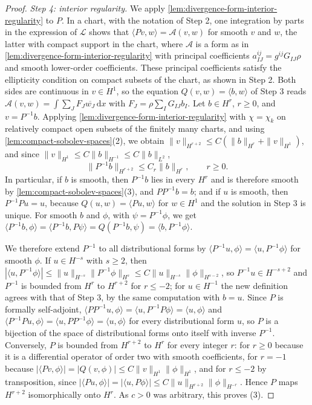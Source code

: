 \begin{proof}
\emph{Step 4: interior regularity.} We apply \cref{lem:divergence-form-interior-regularity} to $P$. In a chart, with the notation of Step 2, one integration by parts in the expression of $\mathcal L$ shows that $\langle Pv,w\rangle=\mathcal A(v,w)$ for smooth $v$ and $w$, the latter with compact support in the chart, where $\mathcal A$ is a form as in \cref{lem:divergence-form-interior-regularity} with principal coefficients $a^{ij}_{IJ}=g^{ij}G_{IJ}\rho$ and smooth lower-order coefficients. These principal coefficients satisfy the ellipticity condition on compact subsets of the chart, as shown in Step 2. Both sides are continuous in $v\in H^1$, so the equation $Q(v,w)=\langle b,w\rangle$ of Step 3 reads $\mathcal A(v,w)=\int\sum_JF_J\overline{w_J}\,\mathrm dx$ with $F_J=\rho\sum_IG_{IJ}b_I$. Let $b\in H^r$, $r\geq0$, and $v=P^{-1}b$. Applying \cref{lem:divergence-form-interior-regularity} with $\chi=\chi_k$ on relatively compact open subsets of the finitely many charts, and using \cref{lem:compact-sobolev-spaces}(2), we obtain $\|v\|_{H^{r+2}}\leq C(\|b\|_{H^r}+\|v\|_{H^1})$, and since $\|v\|_{H^1}\leq C\|b\|_{H^{-1}}\leq C\|b\|_{L^2}$,
\[
 \|P^{-1}b\|_{H^{r+2}}\leq C_r\|b\|_{H^r},\qquad r\geq0.
\]
In particular, if $b$ is smooth, then $P^{-1}b$ lies in every $H^r$ and is therefore smooth by \cref{lem:compact-sobolev-spaces}(3), and $PP^{-1}b=b$; and if $u$ is smooth, then $P^{-1}Pu=u$, because $Q(u,w)=\langle Pu,w\rangle$ for $w\in H^1$ and the solution in Step 3 is unique. For smooth $b$ and $\phi$, with $\psi=P^{-1}\phi$, we get $\langle P^{-1}b,\phi\rangle=\langle P^{-1}b,P\psi\rangle=Q(P^{-1}b,\psi)=\langle b,P^{-1}\phi\rangle$.

We therefore extend $P^{-1}$ to all distributional forms by $\langle P^{-1}u,\phi\rangle=\langle u,P^{-1}\phi\rangle$ for smooth $\phi$. If $u\in H^{-s}$ with $s\geq2$, then $|\langle u,P^{-1}\phi\rangle|\leq\|u\|_{H^{-s}}\|P^{-1}\phi\|_{H^s}\leq C\|u\|_{H^{-s}}\|\phi\|_{H^{s-2}}$, so $P^{-1}u\in H^{-s+2}$ and $P^{-1}$ is bounded from $H^r$ to $H^{r+2}$ for $r\leq-2$; for $u\in H^{-1}$ the new definition agrees with that of Step 3, by the same computation with $b=u$. Since $P$ is formally self-adjoint, $\langle PP^{-1}u,\phi\rangle=\langle u,P^{-1}P\phi\rangle=\langle u,\phi\rangle$ and $\langle P^{-1}Pu,\phi\rangle=\langle u,PP^{-1}\phi\rangle=\langle u,\phi\rangle$ for every distributional form $u$, so $P$ is a bijection of the space of distributional forms onto itself with inverse $P^{-1}$. Conversely, $P$ is bounded from $H^{r+2}$ to $H^r$ for every integer $r$: for $r\geq0$ because it is a differential operator of order two with smooth coefficients, for $r=-1$ because $|\langle Pv,\phi\rangle|=|Q(v,\phi)|\leq C\|v\|_{H^1}\|\phi\|_{H^1}$, and for $r\leq-2$ by transposition, since $|\langle Pu,\phi\rangle|=|\langle u,P\phi\rangle|\leq C\|u\|_{H^{r+2}}\|\phi\|_{H^{-r}}$. Hence $P$ maps $H^{r+2}$ isomorphically onto $H^r$. As $c>0$ was arbitrary, this proves (3).


\end{proof}
